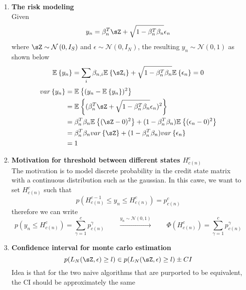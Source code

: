 \documentclass[11pt]{article}
\begin{document}
\renewcommand{\norm}[1]{\left\lVert#1\right\rVert}
\renewcommand{\E}[2][]{\mathbb{E}_{#1}\left\{#2\right\}}
\renewcommand{\var}[2][]{var_{#1}\left\{#2\right\}}
\renewcommand{\cov}[1]{cov\{#1\}} 
\newcommand{\normal}[1]{\mathcal{N}\left(#1\right)}
\newcommand{\exponents}[1]{exp\left\{#1\right\}}
\newcommand{\indicator}[1]{\mathbbm{1}_{#1}}

\renewcommand{\bmu}{\boldsymbol{\mu}}
\renewcommand{\bpi}{\boldsymbol{\pi}}
\newcommand{\bTheta}{\boldsymbol{\Theta}}
\newcommand{\bSigma}{\boldsymbol{\Sigma}}
\renewcommand{\bphi}{\boldsymbol{\phi}}



\begin{enumerate}
    \item \textbf{The risk modeling} \\
    Given 
    \[
        y_n = \beta_n^T \sZ + \sqrt{1 - \beta_n^T \beta_n} \epsilon_n
    \]
    where $\sZ \sim \normal{0, I_S}$ and $\epsilon \sim \normal{0, I_N}$, the resulting $y_n \sim \normal{0,1}$ as shown below 
    \[
        \E{y_n} = \sum_{i} \beta_{n,i} \E{\sZ_i} + \sqrt{1 - \beta_n^T \beta_n} \E{\epsilon_n} = 0
    \]
    \begin{align*}
        \var{y_n} 
        &= \E{(y_n - \E{y_n})^2} \\
        &= \E{ (\beta_n^T \sZ + \sqrt{1 - \beta_n^T \beta_n} \epsilon_n)^2 }\\
        &= \beta_n^T \beta_n \E{(\sZ - 0)^2} + (1-\beta_n^T \beta_n) \E{(\epsilon_n - 0)^2} \\
        &= \beta_n^T \beta_n \var{\sZ} + (1-\beta_n^T \beta_n) \var{\epsilon_n} \\
        &= 1
    \end{align*}
    \item \textbf{Motivation for threshold between different states $H_{c(n)}^c$} \\
    The motivation is to model discrete probability in the credit state matrix with a continuous distribution such as the gaussian. In this cawe, we want to set $H_{c(n)}^c$ such that
    \[
        p(H_{c(n)}^{c-1}\leq y_n \leq H_{c(n)}^c) = p_{c(n)}^c
    \]
    therefore we can write 
    \[
        p(y_n \leq H_{c(n)}^c) = \sum_{\gamma = 1}^c p_{c(n)}^{\gamma}
        \qquad 
        \overset{y_n \sim \normal{0,1}}{\longrightarrow} 
        \qquad 
        \Phi(H_{c(n)}^c) = \sum_{\gamma = 1}^c p_{c(n)}^{\gamma}
    \]
    \item \textbf{Confidence interval for monte carlo estimation}
    \[
        p(L_N(\sZ, \epsilon)\geq l) \in 
        p(L_N(\sZ, \epsilon)\geq l) \pm CI
    \]
    Idea is that for the two naive algorithms that are purported to be equivalent, the CI should be approximately the same
\end{enumerate}
\end{document}
